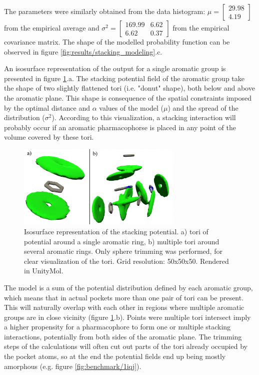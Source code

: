       The parameters were similarly obtained from the data histogram: $\mu = \begin{bmatrix} 29.98 \\ 4.19 \end{bmatrix}$ from the empirical average and $\sigma^2 = \begin{bmatrix} 169.99 & 6.62 \\ 6.62 & 0.37 \end{bmatrix}$ from the empirical covariance matrix. The shape of the modelled probability function can be observed in figure \ref{fig:results/stacking_modeling}.c.

      An isosurface representation of the output for a single aromatic group is presented in figure \ref{fig:results/visualize_stacking}.a. The stacking potential field of the aromatic group take the shape of two slightly flattened tori (i.e. "donut" shape), both below and above the aromatic plane. This shape is consequence of the spatial constraints imposed by the optimal distance and $\alpha$ values of the model ($\mu$) and the spread of the distribution ($\sigma^2$). According to this visualization, a stacking interaction will probably occur if an aromatic pharmacophorse is placed in any point of the volume covered by these tori.

      \begin{figure}[H]
        \centering
        \includegraphics[width=0.7\textwidth]{figures/results/visualize_stacking.png}
        \caption{\label{fig:results/visualize_stacking} Isosurface representation of the stacking potential. a) tori of potential around a single aromatic ring, b) multiple tori around several aromatic rings. Only sphere trimming was performed, for clear visualization of the tori. Grid resolution: 50x50x50. Rendered in UnityMol.}
      \end{figure}

      The model is a sum of the potential distribution defined by each aromatic group, which means that in actual pockets more than one pair of tori can be present. This will naturally overlap with each other in regions where multiple aromatic groups are in close vicinity (figure \ref{fig:results/visualize_stacking}.b). Points were multiple tori intersect imply a higher propensity for a pharmacophore to form one or multiple stacking interactions, potentially from both sides of the aromatic plane. The trimming steps of the calculations will often cut out parts of the tori already occupied by the pocket atoms, so at the end the potential fields end up being mostly amorphous (e.g. figure \ref{fig:benchmark/1iqj}).

